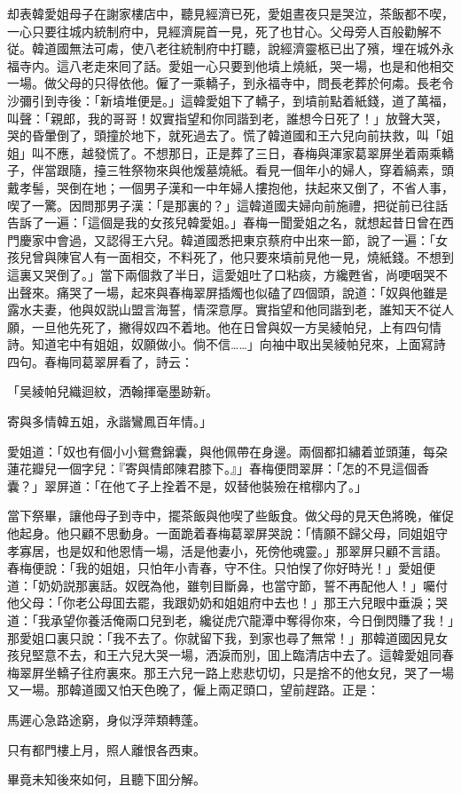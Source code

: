 却表韓愛姐母子在謝家樓店中，聽見經濟已死，愛姐晝夜只是哭泣，茶飯都不喫，一心只要往城内統制府中，見經濟屍首一見，死了也甘心。父母旁人百般勸解不従。韓道國無法可䖏，使八老往統制府中打聽，說經濟靈柩已出了殯，埋在城外永福寺内。這八老走來囘了話。愛姐一心只要到他墳上燒紙，哭一場，也是和他相交一場。做父母的只得依他。僱了一乘轎子，到永福寺中，問長老葬於何䖏。長老令沙彌引到寺後：「新墳堆便是。」這韓愛姐下了轎子，到墳前點着紙錢，道了萬福，叫聲：「親郎，我的哥哥！奴實指望和你同諧到老，誰想今日死了！」放聲大哭，哭的昏暈倒了，頭撞於地下，就死過去了。慌了韓道國和王六兒向前扶救，叫「姐姐」叫不應，越發慌了。不想那日，正是葬了三日，春梅與渾家葛翠屏坐着兩乘轎子，伴當跟隨，擡三牲祭物來與他煖墓燒紙。看見一個年小的婦人，穿着縞素，頭戴孝髻，哭倒在地；一個男子漢和一中年婦人摟抱他，扶起來又倒了，不省人事，喫了一驚。因問那男子漢：「是那裏的？」這韓道國夫婦向前施禮，把従前已往話告訴了一遍：「這個是我的女孩兒韓愛姐。」春梅一聞愛姐之名，就想起昔日曾在西門慶家中會過，又認得王六兒。韓道國悉把東京蔡府中出來一節，說了一遍：「女孩兒曾與陳官人有一面相交，不料死了，他只要來墳前見他一見，燒紙錢。不想到這裏又哭倒了。」當下兩個救了半日，這愛姐吐了口粘痰，方纔甦省，尚哽咽哭不出聲來。痛哭了一場，起來與春梅翠屏插燭也似磕了四個頭，說道：「奴與他雖是露水夫妻，他與奴説山盟言海誓，情深意厚。實指望和他同諧到老，誰知天不従人願，一旦他先死了，撇得奴四不着地。他在日曾與奴一方吴綾帕兒，上有四句情詩。知道宅中有姐姐，奴願做小。倘不信……」向袖中取出吴綾帕兒來，上面寫詩四句。春梅同葛翠屏看了，詩云：

\begin{myquote}
「吴綾帕兒織迴紋，洒翰揮毫墨跡新。

寄與多情韓五姐，永諧鸞鳳百年情。」
\end{myquote}

愛姐道：「奴也有個小小鴛鴦錦囊，與他佩帶在身邊。兩個都扣繡着並頭蓮，每朶蓮花瓣兒一個字兒：『寄與情郎陳君膝下。』」春梅便問翠屏：「怎的不見這個香囊？」翠屏道：「在他て子上拴着不是，奴替他裝殮在棺槨内了。」

當下祭畢，讓他母子到寺中，擺茶飯與他喫了些飯食。做父母的見天色將晚，催促他起身。他只顧不思動身。一面跪着春梅葛翠屏哭說：「情願不歸父母，同姐姐守孝寡居，也是奴和他恩情一場，活是他妻小，死傍他魂靈。」那翠屏只顧不言語。春梅便說：「我的姐姐，只怕年小青春，守不住。只怕悮了你好時光！」愛姐便道：「奶奶説那裏話。奴旣為他，雖刳目斷鼻，也當守節，誓不再配他人！」囑付他父母：「你老公母囬去罷，我跟奶奶和姐姐府中去也！」那王六兒眼中垂淚；哭道：「我承望你養活俺兩口兒到老，纔従虎穴龍潭中奪得你來，今日倒閃賺了我！」那愛姐口裏只說：「我不去了。你就留下我，到家也尋了無常！」那韓道國因見女孩兒堅意不去，和王六兒大哭一場，洒淚而別，囬上臨清店中去了。這韓愛姐同春梅翠屛坐轎子往府裏來。那王六兒一路上悲悲切切，只是捨不的他女兒，哭了一場又一場。那韓道國又怕天色晚了，僱上兩疋頭口，望前趕路。正是：

\begin{myquote}
馬遲心急路途窮，身似浮萍類轉蓬。

只有都門樓上月，照人離恨各西東。
\end{myquote}

畢竟未知後來如何，且聽下囬分解。

